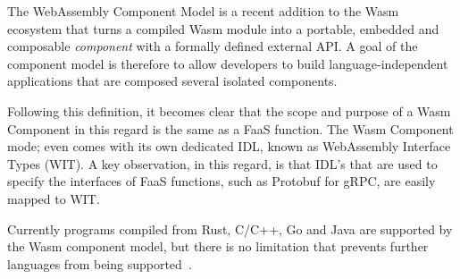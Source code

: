 The WebAssembly Component Model \cite{compmodel} is a recent addition to the Wasm ecosystem that turns a compiled Wasm module into a portable, embedded and composable \emph{component} with a formally defined external API. A goal of the component model is therefore to allow developers to build language-independent applications that are composed several isolated components.

Following this definition, it becomes clear that the scope and purpose of a Wasm Component in this regard is the same as a FaaS function. The Wasm Component mode; even comes with its own dedicated IDL, known as WebAssembly Interface Types (WIT). A key observation, in this regard, is that IDL's that are used to specify the interfaces of FaaS functions, such as Protobuf for gRPC, are easily mapped to WIT.

Currently programs compiled from Rust, C/C++, Go and Java are supported by the Wasm component model, but there is no limitation that prevents further languages from being supported~\cite{bindgen}.


